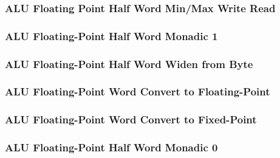 \subsubsection[{\small ALU Floating Point Half Word Min/Max Write Read}]{ALU Floating Point Half Word Min/Max Write Read} \label{sec:format-ALU-FHMMWR}



\subsubsection[{\small ALU Floating-Point Half Word Monadic 1}]{ALU Floating-Point Half Word Monadic 1} \label{sec:format-ALU-FHMO1}



\subsubsection[{\small ALU Floating-Point Half Word Widen from Byte}]{ALU Floating-Point Half Word Widen from Byte} \label{sec:format-ALU-FHWIDEN}



\subsubsection[{\small ALU Floating-Point Word Convert to Floating-Point}]{ALU Floating-Point Word Convert to Floating-Point} \label{sec:format-ALU-FHFLOAT}



\subsubsection[{\small ALU Floating-Point Word Convert to Fixed-Point}]{ALU Floating-Point Word Convert to Fixed-Point} \label{sec:format-ALU-FHFIXED}



\subsubsection[{\small ALU Floating-Point Half Word Monadic 0}]{ALU Floating-Point Half Word Monadic 0} \label{sec:format-ALU-FHMO0}

